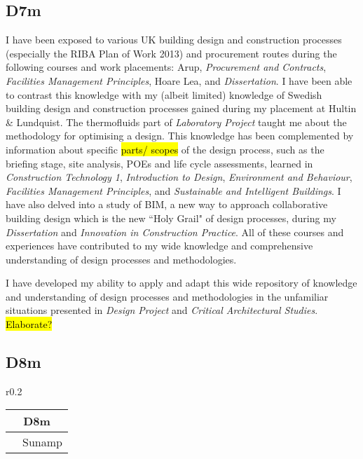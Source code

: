 \subsection*{D7m}

I have been exposed to various UK building design and construction processes (especially the RIBA Plan of Work 2013) and procurement routes during the following courses and work placements:
Arup,
\textit{Procurement and Contracts},
\textit{Facilities Management Principles},
Hoare Lea,
and
\textit{Dissertation}.
I have been able to contrast this knowledge with my (albeit limited) knowledge of Swedish building design and construction processes gained during my placement at Hultin \& Lundquist.
The thermofluids part of \textit{Laboratory Project} taught me about the methodology for optimising a design.
This knowledge has been complemented by information about specific \hl{parts/ scopes} of the design process, such as the briefing stage, site analysis, POEs and life cycle assessments, learned in
\textit{Construction Technology 1},
\textit{Introduction to Design},
\textit{Environment and Behaviour},
\textit{Facilities Management Principles},
and \textit{Sustainable and Intelligent Buildings}.
I have also delved into a study of BIM, a new way to approach collaborative building design which is the new ``Holy Grail" of design processes, during my \textit{Dissertation} and \textit{Innovation in Construction Practice}.
All of these courses and experiences have contributed to my wide knowledge and comprehensive understanding of design processes and methodologies.

I have developed my ability to apply and adapt this wide repository of knowledge and understanding of design processes and methodologies in the unfamiliar situations presented in \textit{Design Project} and \textit{Critical Architectural Studies}.
\hl{Elaborate?}


\subsection*{D8m}

\begin{wraptable}{r}{0.2\textwidth}
	\begin{tabular}{|ll|}
		\hline
		\multicolumn{2}{|c|}{\cellcolor[HTML]{F8A102}\textbf{D8m}} \\ \hline
		\PRJ & Sunamp \\ \hline
	\end{tabular}
\end{wraptable}

